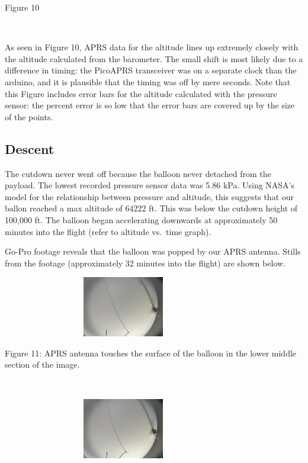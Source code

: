 \documentclass[12pt,]{article}
\begin{document}
Figure 10

~

As seen in Figure 10, APRS data for the altitude lines up extremely
closely with the altitude calculated from the barometer. The small shift
is most likely due to a difference in timing: the PicoAPRS transceiver
was on a separate clock than the arduino, and it is plausible that the
timing was off by mere seconds. Note that this Figure includes error
bars for the altitude calculated with the pressure sensor: the percent
error is so low that the error bars are covered up by the size of the
points.

\subsection{Descent}\label{descent}

The cutdown never went off because the balloon never detached from the
payload. The lowest recorded pressure sensor data was 5.86 kPa. Using
NASA's model for the relationship between pressure and altitude, this
suggests that our ballon reached a max altitude of 64222 ft. This was
below the cutdown height of 100,000 ft. The balloon began accelerating
downwards at approximately 50 minutes into the flight (refer to altitude
vs.~time graph).

Go-Pro footage reveals that the balloon was popped by our APRS antenna.
Stills from the footage (approximately 32 minutes into the flight) are
shown below.

\begin{center}\includegraphics[width=400px,height=100px]{assets/IMAGEBREAKA} \end{center}

Figure 11: APRS antenna touches the surface of the balloon in the lower
middle section of the image.

~

\begin{center}\includegraphics[width=400px,height=100px]{assets/IMAGEBREAKB} \end{center}
\end{document}
